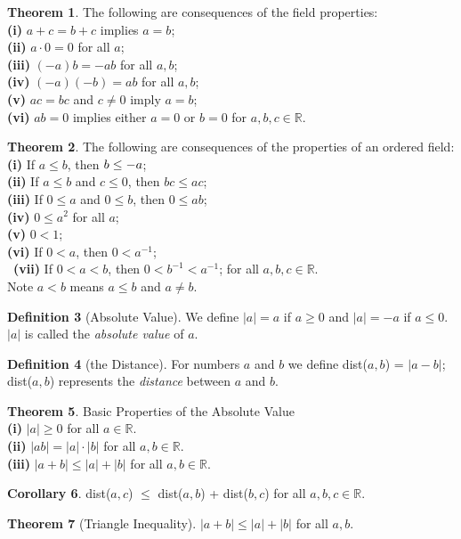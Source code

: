 \documentclass{book}
\theoremstyle{definition}
\newtheorem{definition}{Definition}[section]
\newtheorem{theorem}[definition]{Theorem}
\newtheorem{corollary}[definition]{Corollary}
\begin{document}
\begin{theorem}
The following are consequences of the field properties:
\\ \textbf{(i)} $a+c=b+c$ implies $a=b$;
\\ \textbf{(ii)} $a \cdot 0 = 0$ for all $a$;
\\ \textbf{(iii)} $(-a)b=-ab$ for all $a,b$;
\\ \textbf{(iv)} $(-a)(-b)=ab$ for all $a,b$;
\\ \textbf{(v)} $ac=bc$ and $c \neq 0$ imply $a=b$;
\\ \textbf{(vi)} $ab=0$ implies either $a=0$ or $b=0$ for $a,b,c \in \mathbb{R}$.
\end{theorem}
\begin{theorem}
The following are consequences of the properties of an ordered field:
\\ \textbf{(i)} If $a \leq b$, then $\-b \leq -a$;
\\ \textbf{(ii)} If $a \leq b$ and $c \leq 0$, then $bc \leq ac$;
\\ \textbf{(iii)} If $0 \leq a$ and $0 \leq b$, then $0 \leq ab$;
\\ \textbf{(iv)} $0 \leq a^2$ for all $a$;
\\ \textbf{(v)} $0 < 1$;
\\ \textbf{(vi)} If $0 < a$, then $0 < a^{-1}$;
\\\ \textbf{(vii)} If $0 < a < b$, then $0 < b^{-1} < a^{-1}$; for all $a,b,c \in \mathbb{R}$.
\\ Note $a<b$ means $a \leq b$ and $a \neq b$.
\end{theorem}
\begin{definition}[Absolute Value]
We define $|a| = a$ if $a \geq 0$ and $|a| = -a$ if $a \leq 0$.
\\ $|a|$ is called the \textit{absolute value} of $a$.
\end{definition}
\begin{definition}[the Distance]
For numbers $a$ and $b$ we define dist($a,b$) = $|a-b|$; dist($a,b$) represents the \textit{distance} between $a$ and $b$.
\end{definition}
\begin{theorem}
Basic Properties of the Absolute Value
\\ \textbf{(i)} $|a| \geq 0$ for all $a \in \mathbb{R}$.
\\ \textbf{(ii)} $|ab| = |a| \cdot |b|$ for all $a,b \in \mathbb{R}$.
\\ \textbf{(iii)} $|a+b| \leq |a| + |b|$ for all $a,b \in \mathbb{R}$.
\end{theorem}
\begin{corollary}
dist($a,c$) $\leq$ dist($a,b$) + dist($b,c$) for all $a,b,c \in \mathbb{R}$.
\end{corollary}
\begin{theorem}[Triangle Inequality]
$|a+b| \leq |a| + |b|$ for all $a,b$.
\end{theorem}
\end{document}
